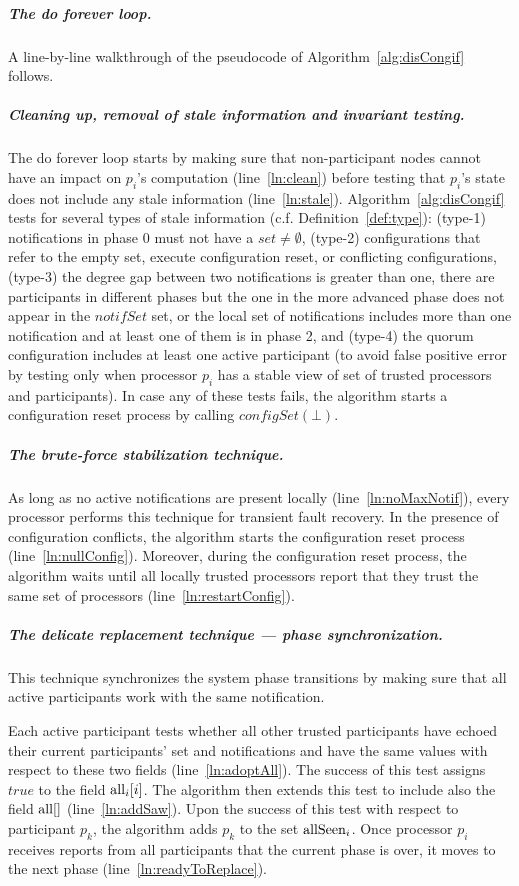 \documentclass[11pt]{article}
\newcommand{\notifSet}{notifSet}
\newcommand{\boldsubparagraph}[1]{\subparagraph{\bf #1}}
\begin{document}
\boldsubparagraph{The do forever loop.} 
A line-by-line walkthrough of the pseudocode of Algorithm~\ref{alg:disCongif} follows.

\subparagraph{Cleaning up, removal of stale information and invariant testing.} The do forever loop starts by making sure that non-participant nodes cannot have an impact on $p_i$'s computation (line~\ref{ln:clean}) before testing that $p_i$'s state does not include any stale information (line~\ref{ln:stale}). Algorithm~\ref{alg:disCongif} tests for several types of stale information (c.f. Definition~\ref{def:type}): (type-1) notifications in phase 0 must not have a $set \neq \emptyset$, (type-2) configurations that refer to the empty set, execute configuration reset, or conflicting  configurations, (type-3) the degree gap between two notifications is greater than one, there are participants in different  phases but the one in the more advanced phase does not appear in the $\notifSet$ set, or the local set of notifications includes more than one notification and at least one of them is in phase 2, and (type-4)
the quorum configuration includes at least one active participant (to avoid false positive error by testing only when processor $p_i$ has a stable view of set of trusted processors and participants). In case any of these tests fails, the algorithm starts a configuration reset process by calling $configSet(\bot)$.

\subparagraph{The brute-force stabilization technique.}
As long as no active notifications are present locally (line~\ref{ln:noMaxNotif}), every processor performs this technique for transient fault recovery. In the presence of configuration conflicts, the algorithm starts the configuration reset process (line~\ref{ln:nullConfig}). Moreover, during the configuration reset process, the algorithm waits until all locally trusted processors report that they trust the same set of processors (line~\ref{ln:restartConfig}).



\subparagraph{The delicate replacement technique --- phase synchronization.}
This technique synchronizes the system phase transitions by making sure that all active participants work with the same notification.

Each active participant tests whether all other trusted participants have echoed their current participants' set and notifications and have the same values with respect to these two fields     
(line~\ref{ln:adoptAll}). The success of this test assigns $true$ to the field $\textnormal{all}_i[i]$. The algorithm then extends this test to include also the field $\textnormal{all}[]$ (line~\ref{ln:addSaw}). Upon the success of this test with respect to participant $p_k$, the algorithm adds $p_k$ to the set $\textnormal{allSeen}_i$.
Once processor $p_i$ receives reports from all participants that the current phase is over, it moves to the next phase (line~\ref{ln:readyToReplace}).
\end{document}
